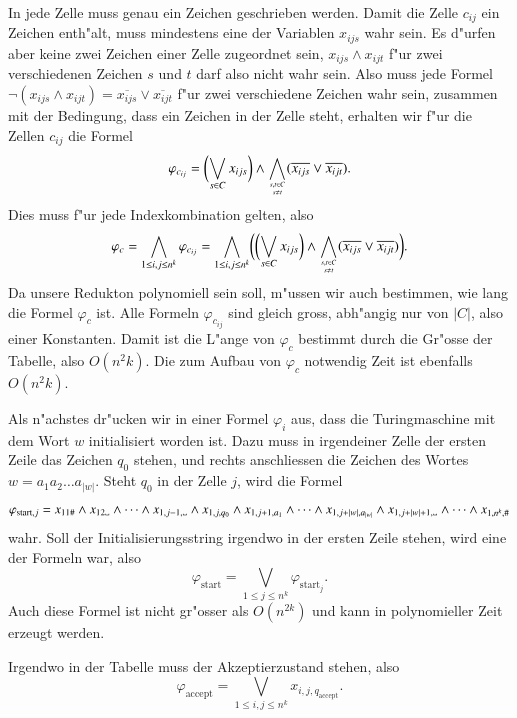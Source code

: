 In jede Zelle muss genau ein Zeichen geschrieben werden. Damit die Zelle
$c_{ij}$ ein Zeichen enth"alt, muss mindestens eine der Variablen $x_{ijs}$
wahr sein. Es d"urfen aber keine zwei Zeichen einer Zelle zugeordnet sein,
$x_{ijs}\wedge x_{ijt}$ f"ur zwei verschiedenen Zeichen $s$ und $t$ darf
also nicht wahr sein. Also muss jede Formel
$\neg(x_{ijs}\wedge x_{ijt})=\overline{x_{ijs}}\vee\overline{x_{ijt}}$
f"ur zwei verschiedene Zeichen wahr sein, zusammen mit der
Bedingung, dass ein Zeichen in der Zelle steht, erhalten wir
f"ur die Zellen $c_{ij}$ die Formel
\[
\varphi_{c_{ij}}=
\biggl(\bigvee_{s\in C} x_{ijs}\biggr)\wedge
\bigwedge_{\myatop{s,t\in C}{s\ne t}} (\overline{x_{ijs}}\vee\overline{x_{ijt}}).
\]
Dies muss f"ur jede Indexkombination gelten, also
\[
\varphi_c
=
\bigwedge_{1\le i,j\le n^k}
\varphi_{c_{ij}}
=
\bigwedge_{1\le i,j\le n^k}\biggl(
\biggl(\bigvee_{s\in C} x_{ijs}\biggr)\wedge
\bigwedge_{\myatop{s,t\in C}{s\ne t}} (\overline{x_{ijs}}\vee\overline{x_{ijt}})
\biggr).
\]
Da unsere Redukton polynomiell sein soll, m"ussen wir auch bestimmen,
wie lang die Formel $\varphi_c$ ist. Alle Formeln $\varphi_{c_{ij}}$
sind gleich gross, abh"angig nur von $|C|$, also einer Konstanten.
Damit ist die L"ange von $\varphi_c$ bestimmt durch die Gr"osse der
Tabelle, also $O(n^2k)$. Die zum Aufbau von $\varphi_c$ notwendig Zeit
ist ebenfalls $O(n^2k)$.

Als n"achstes dr"ucken wir in einer Formel $\varphi_i$ aus,
dass die Turingmaschine mit dem
Wort $w$ initialisiert worden ist. Dazu muss in irgendeiner
Zelle der ersten Zeile das Zeichen $q_0$ stehen, und rechts
anschliessen die Zeichen des Wortes $w=a_1a_2\dots a_{|w|}$.
Steht $q_0$ in der
Zelle $j$, wird die Formel
\[
\varphi_{\text{start},j}
=
x_{11\#}\wedge
x_{12\blank}\wedge \dots \wedge
x_{1,j-1,\blank}\wedge
x_{1,j,q_0}\wedge
x_{1,j+1,a_1}\wedge\dots\wedge
x_{1,j+|w|,a_{|w|}}\wedge
x_{1,j+|w|+1,\blank}\wedge\dots\wedge
x_{1,n^k,\#}
\]
wahr.
Soll der Initialisierungsstring irgendwo in der ersten Zeile
stehen, wird eine der Formeln war, also
\[
\varphi_{\text{start}} = \bigvee_{1\le j\le n^k} \varphi_{\text{start}_j}.
\]
Auch diese Formel ist nicht gr"osser als $O(n^{2k})$ und kann in
polynomieller Zeit erzeugt werden.

Irgendwo in der Tabelle muss der Akzeptierzustand stehen, also
\[
\varphi_{\text{accept}} 
=
\bigvee_{1\le i,j\le n^k} x_{i,j,q_{\text{accept}}}.
\]

